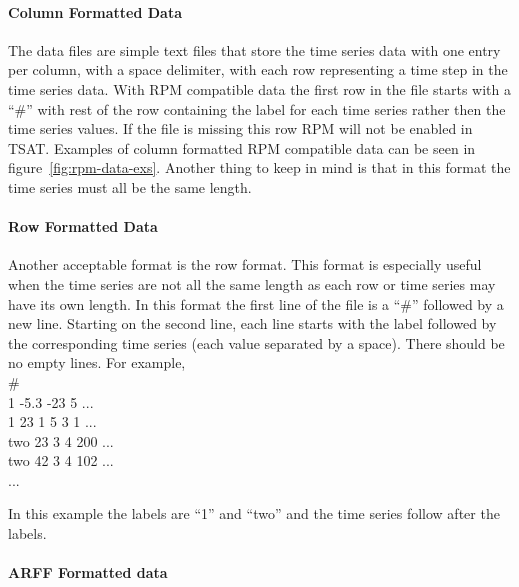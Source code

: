 \documentclass[titlepage, letterpaper, 12pt]{article}
\newenvironment{allintypewriter}{\ttfamily}{\par}
\begin{document}
\paragraph{Column Formatted Data}
The data files are simple text files that store the time series data with one entry per column, with a space delimiter, with each row representing a time step in the time series data. With RPM compatible data the first row in the file starts with a ``\#'' with rest of the row containing the label for each time series rather then the time series values. If the file is missing this row RPM will not be enabled in TSAT. Examples of column formatted RPM compatible data can be seen in figure~\ref{fig:rpm-data-exs}.  Another thing to keep in mind is that in this format the time series must all be the same length. 

\paragraph{Row Formatted Data}
Another acceptable format is the row format.  This format is especially useful  when the time series are not all the same length as each row or time series may have its own length.  In this format the first line of the file is a ``\#'' followed by a new line.  Starting on the second line, each line starts with the label followed by the corresponding time series (each value separated by a space).  There should be no empty lines.  For example,\\
\begin{allintypewriter}
	\noindent\#\\
	1 -5.3 -23 5 ...\\
	1 23 1 5 3 1 ...\\
	two 23 3 4 200 ...\\
	two 42 3 4 102 ...\\
	...
\end{allintypewriter}
In this example the labels are ``1'' and ``two'' and the time series follow after the labels.

\paragraph{ARFF Formatted data}
\end{document}
